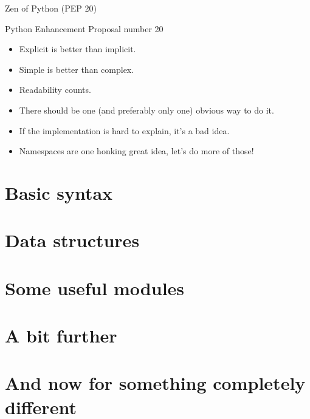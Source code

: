 \documentclass[ignorenonframetext,]{beamer}
\begin{document}
\begin{frame}{Zen of Python (PEP 20)}

    Python Enhancement Proposal number 20

    \begin{itemize}
        \item Explicit is better than implicit.
        \item Simple is better than complex.
        \item Readability counts.
        \item There should be one (and preferably only one) obvious way to do it.
        \item If the implementation is hard to explain, it's a bad idea.
        \item Namespaces are one honking great idea, let's do more of those!
    \end{itemize}
\end{frame}

\section{Basic syntax}\label{basic-syntax}

\section{Data structures}\label{data-structures}

\section{Some useful modules}\label{some-useful-modules}

\section{A bit further}\label{a-bit-further}

\section{And now for something completely
different}\label{and-now-for-something-completely-different}
\end{document}
